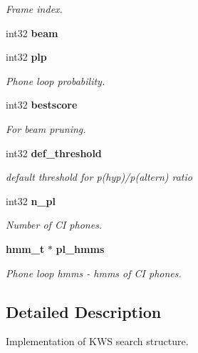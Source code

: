 \begin{DoxyCompactItemize}
\begin{DoxyCompactList}\small\item\em Frame index. \end{DoxyCompactList}\item 
int32 {\bfseries beam}\label{structkws__search__s_a5a84597099359059301dc6124579732e}

\item 
int32 {\bf plp}\label{structkws__search__s_a3bfc1d19e39d1cd321ce47280f1abe00}

\begin{DoxyCompactList}\small\item\em Phone loop probability. \end{DoxyCompactList}\item 
int32 {\bf bestscore}\label{structkws__search__s_a0a04bba471516468d1b2bea14632f255}

\begin{DoxyCompactList}\small\item\em For beam pruning. \end{DoxyCompactList}\item 
int32 {\bf def\-\_\-threshold}\label{structkws__search__s_afce4456a796dbc72149d7a47159ccca9}

\begin{DoxyCompactList}\small\item\em default threshold for p(hyp)/p(altern) ratio \end{DoxyCompactList}\item 
int32 {\bf n\-\_\-pl}\label{structkws__search__s_aab6e42d0c93af992c16e2a75db386df4}

\begin{DoxyCompactList}\small\item\em Number of C\-I phones. \end{DoxyCompactList}\item 
{\bf hmm\-\_\-t} $\ast$ {\bf pl\-\_\-hmms}\label{structkws__search__s_a7b501f4cc5f4efb7b4ca0259afcf4e05}

\begin{DoxyCompactList}\small\item\em Phone loop hmms -\/ hmms of C\-I phones. \end{DoxyCompactList}\end{DoxyCompactItemize}


\subsection{Detailed Description}
Implementation of K\-W\-S search structure. 

